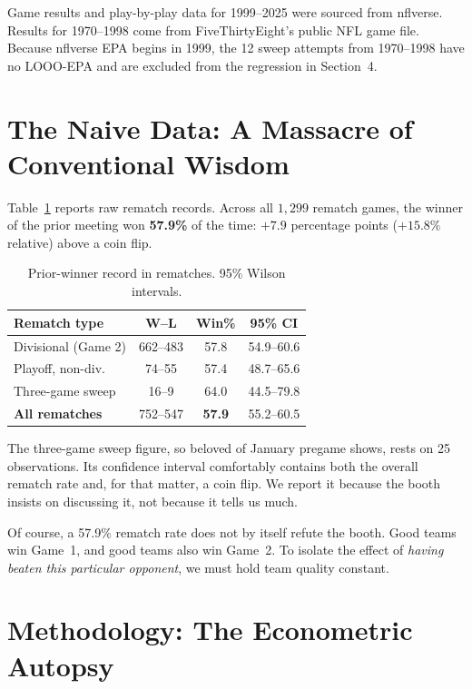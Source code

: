 \documentclass[10pt,twocolumn,letterpaper]{article}
\begin{document}
Game results and play-by-play data for 1999--2025 were sourced from nflverse. Results for 1970--1998 come from FiveThirtyEight's public NFL game file. Because nflverse EPA begins in 1999, the 12 sweep attempts from 1970--1998 have no LOOO-EPA and are excluded from the regression in Section~4.

\section{The Naive Data: A Massacre of Conventional Wisdom}
Table~\ref{tab:naive} reports raw rematch records. Across all $1{,}299$ rematch games, the winner of the prior meeting won \textbf{57.9\%} of the time: $+7.9$ percentage points ($+15.8\%$ relative) above a coin flip.

\begin{table}[h]
\centering
\small
\caption{Prior-winner record in rematches. 95\% Wilson intervals.}
\label{tab:naive}
\begin{tabular}{@{}lccc@{}}
\toprule
\textbf{Rematch type} & \textbf{W--L} & \textbf{Win\%} & \textbf{95\% CI} \\
\midrule
Divisional (Game 2)     & 662--483 & 57.8 & 54.9--60.6 \\
Playoff, non-div.       & 74--55   & 57.4 & 48.7--65.6 \\
Three-game sweep        & 16--9    & 64.0 & 44.5--79.8 \\
\midrule
\textbf{All rematches}  & 752--547 & \textbf{57.9} & 55.2--60.5 \\
\bottomrule
\end{tabular}
\end{table}

The three-game sweep figure, so beloved of January pregame shows, rests on 25 observations. Its confidence interval comfortably contains both the overall rematch rate and, for that matter, a coin flip. We report it because the booth insists on discussing it, not because it tells us much.

Of course, a 57.9\% rematch rate does not by itself refute the booth. Good teams win Game~1, and good teams also win Game~2. To isolate the effect of \textit{having beaten this particular opponent}, we must hold team quality constant.

\section{Methodology: The Econometric Autopsy}
\end{document}
